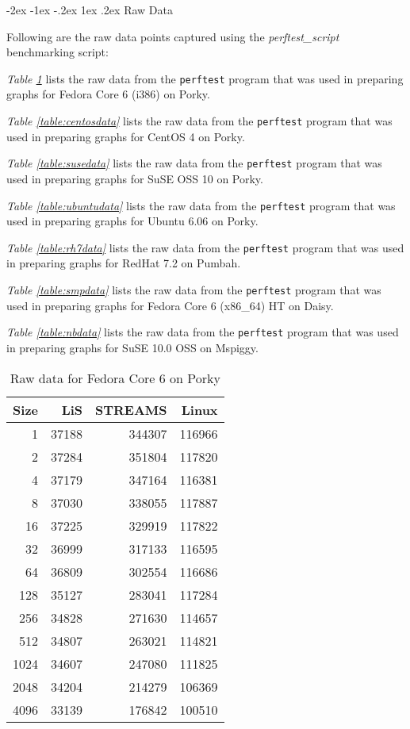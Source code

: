 \documentclass[letterpaper,final,notitlepage,twocolumn,10pt,twoside]{article}
\makeatletter
\renewcommand\section{\@startsection {section}{1}{\z@}%
                                   {-2ex \@plus -1ex \@minus -.2ex}%
                                   {1ex \@plus .2ex}%
                                   {\normalfont\large\bfseries}}
\makeatother
\begin{document}
\begin{appendix}
\section{Raw Data}
\label{section:rawdata}

Following are the raw data points captured using the \textsl{perftest\_script}
benchmarking script:

\textit{Table \ref{table:fc6data}} lists the raw data from the
\texttt{perftest} program that was used in preparing graphs for Fedora Core 6
(i386) on Porky.

\textit{Table \ref{table:centosdata}} lists the raw data from the
\texttt{perftest} program that was used in preparing graphs for CentOS 4 on
Porky.

\textit{Table \ref{table:susedata}} lists the raw data from the
\texttt{perftest} program that was used in preparing graphs for SuSE OSS 10 on
Porky.

\textit{Table \ref{table:ubuntudata}} lists the raw data from the
\texttt{perftest} program that was used in preparing graphs for Ubuntu 6.06 on
Porky.

\textit{Table \ref{table:rh7data}} lists the raw data from the
\texttt{perftest} program that was used in preparing graphs for RedHat 7.2 on
Pumbah.

\textit{Table \ref{table:smpdata}} lists the raw data from the
\texttt{perftest} program that was used in preparing graphs for Fedora Core 6
(x86\_64) HT on Daisy.

\textit{Table \ref{table:nbdata}} lists the raw data from the
\texttt{perftest} program that was used in preparing graphs for SuSE 10.0 OSS
on Mspiggy.

\begin{table}[hp]
\footnotesize
\center\begin{tabular}{rrrr}\\
\hline
Size & LiS & STREAMS & Linux\\
\hline
\hline
1 & 37188 & 344307 & 116966\\
2 & 37284 & 351804 & 117820\\
4 & 37179 & 347164 & 116381\\
8 & 37030 & 338055 & 117887\\
16 & 37225 & 329919 & 117822\\
32 & 36999 & 317133 & 116595\\
64 & 36809 & 302554 & 116686\\
128 & 35127 & 283041 & 117284\\
256 & 34828 & 271630 & 114657\\
512 & 34807 & 263021 & 114821\\
1024 & 34607 & 247080 & 111825\\
2048 & 34204 & 214279 & 106369\\
4096 & 33139 & 176842 & 100510\\
\hline
\end{tabular}
\caption{Raw data for Fedora Core 6 on Porky}
\label{table:fc6data}
\normalsize
\end{table}


\end{appendix}
\end{document}
